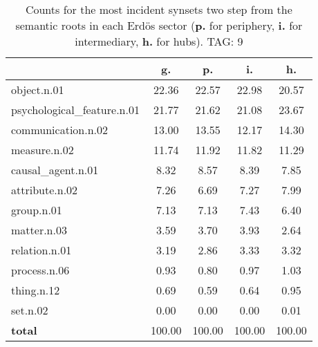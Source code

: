 \begin{table}[h!]
\begin{center}
\begin{tabular}{| l || c | c | c | c |}\hline
 & {\bf g.} & {\bf p.} & {\bf i.} & {\bf h.} \\\hline\hline
object.n.01 & 22.36  & 22.57  & 22.98  & 20.57 \\\hline
psychological\_feature.n.01 & 21.77  & 21.62  & 21.08  & 23.67 \\\hline
communication.n.02 & 13.00  & 13.55  & 12.17  & 14.30 \\\hline
measure.n.02 & 11.74  & 11.92  & 11.82  & 11.29 \\\hline
causal\_agent.n.01 & 8.32  & 8.57  & 8.39  & 7.85 \\\hline
attribute.n.02 & 7.26  & 6.69  & 7.27  & 7.99 \\\hline
group.n.01 & 7.13  & 7.13  & 7.43  & 6.40 \\\hline
matter.n.03 & 3.59  & 3.70  & 3.93  & 2.64 \\\hline
relation.n.01 & 3.19  & 2.86  & 3.33  & 3.32 \\\hline
process.n.06 & 0.93  & 0.80  & 0.97  & 1.03 \\\hline
thing.n.12 & 0.69  & 0.59  & 0.64  & 0.95 \\\hline
set.n.02 & 0.00  & 0.00  & 0.00  & 0.01 \\\hline\hline
{{\bf total}} & 100.00  & 100.00  & 100.00  & 100.00 \\\hline
\end{tabular}
\caption{Counts for the most incident synsets two step from the semantic roots in each Erd\"os sector ({\bf p.} for periphery, {\bf i.} for intermediary, {\bf h.} for hubs). TAG: 9}
\end{center}
\end{table}